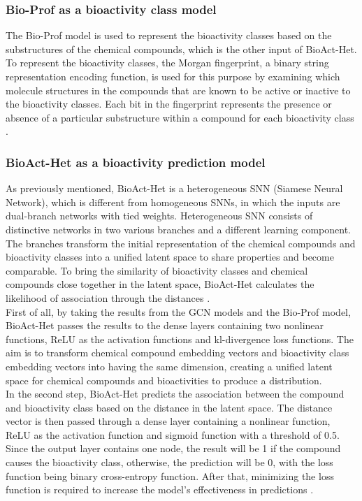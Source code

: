\documentclass[conference]{IEEEtran}
\begin{document}
\subsubsection{Bio-Prof as a bioactivity class model}
The Bio-Prof model is used to represent the bioactivity classes based on the substructures of the chemical compounds, which is the other input of BioAct-Het. To represent the bioactivity classes, the Morgan fingerprint, a binary string representation encoding function, is used for this purpose by examining which molecule structures in the compounds that are known to be active or inactive to the bioactivity classes. Each bit in the fingerprint represents the presence or absence of a particular substructure within a compound for each bioactivity class \citet{Morgan}.\\

\subsubsection{BioAct-Het as a bioactivity prediction model}
As previously mentioned, BioAct-Het is a heterogeneous SNN (Siamese Neural Network), which is different from homogeneous SNNs, in which the inputs are dual-branch networks with tied weights. Heterogeneous SNN consists of distinctive networks in two various branches and a different learning component. The branches transform the initial representation of the chemical compounds and bioactivity classes into a unified latent space to share properties and become comparable. To bring the similarity of bioactivity classes and chemical compounds close together in the latent space, BioAct-Het calculates the likelihood of association through the distances \citet{Bemis}.\\

First of all, by taking the results from the GCN models and the Bio-Prof model, BioAct-Het passes the results to the dense layers containing two nonlinear functions, ReLU as the activation functions and kl-divergence loss functions. The aim is to transform chemical compound embedding vectors and bioactivity class embedding vectors into having the same dimension, creating a unified latent space for chemical compounds and bioactivities to produce a distribution.\\

In the second step, BioAct-Het predicts the association between the compound and bioactivity class based on the distance in the latent space. The distance vector is then passed through a dense layer containing a nonlinear function, ReLU as the activation function and sigmoid function with a threshold of 0.5. Since the output layer contains one node, the result will be 1 if the compound causes the bioactivity class, otherwise, the prediction will be 0, with the loss function being binary cross-entropy function. After that, minimizing the loss function is required to increase the model’s effectiveness in predictions \citet{Wu}.\\
\end{document}
